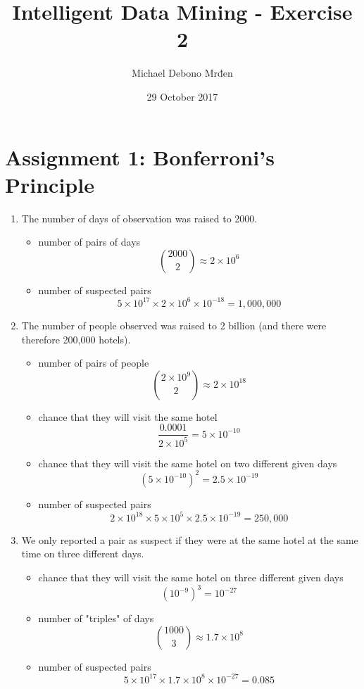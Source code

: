 \documentclass{article}
\title{Intelligent Data Mining - Exercise 2}
\author{Michael Debono Mrđen}
\date{29 October 2017}
\begin{document}
\maketitle

\section{Assignment 1: Bonferroni's Principle}
\renewcommand{\labelenumi}{\alph{enumi}.}
\renewcommand{\labelenumii}{(\alph{enumii})}
\begin{enumerate}
\item{The number of days of observation was raised to 2000.
\begin{itemize}
\item{number of pairs of days
\[ \binom{2000}{2} \approx 2 \times 10^6 \]}
\item{number of suspected pairs
\[ 5 \times 10^{17} \times 2 \times 10^6 \times 10^{-18} = 1,000,000 \]}
\end{itemize}
}

\item{The number of people observed was raised to 2 billion (and there were therefore 200,000 hotels).
\begin{itemize}
\item{number of pairs of people
\[ \binom{2 \times 10^9}{2} \approx 2 \times 10^{18} \]}
\item{chance that they will visit the same hotel
\[ \frac{0.0001}{2 \times 10^5} = 5 \times 10^{-10} \]}
\item{chance that they will visit the same hotel on two different given days
\[ (5 \times 10^{-10})^2 = 2.5 \times 10^{-19} \]}
\item{number of suspected pairs
\[ 2 \times 10^{18} \times 5 \times 10^5 \times 2.5 \times 10^{-19} = 250,000 \]}
\end{itemize}
}

\item{We only reported a pair as suspect if they were at the same hotel at the same time on three different days.
\begin{itemize}
\item{chance that they will visit the same hotel on three different given days
\[ (10^{-9})^3 = 10^{-27} \]}
\item{number of "triples" of days
\[ \binom{1000}{3} \approx 1.7 \times 10^8 \]}
\item{number of suspected pairs
\[ 5 \times 10^{17} \times 1.7 \times 10^8 \times 10^{-27} = 0.085 \]}
\end{itemize}
}
\end{enumerate}
\end{document}

